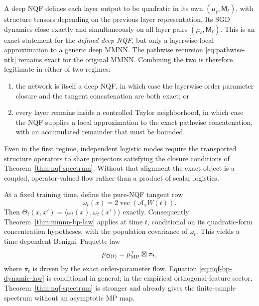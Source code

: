 \documentclass{article}
\begin{document}
A deep NQF defines each layer output to be quadratic in its own
\((\mu_\ell,\mathsf M_\ell)\), with structure tensors depending on the
previous layer representation.  Its SGD dynamics close exactly and
simultaneously on all layer pairs \((\mu_\ell,\mathsf M_\ell)\).  This is an
exact statement for the \emph{defined deep NQF}, but only a layerwise local
approximation to a generic deep MMNN.  The pathwise recursion
\eqref{eq:pathwise-ntk} remains exact for the original MMNN.  Combining the
two is therefore legitimate in either of two regimes:
\begin{enumerate}[leftmargin=1.5em]
\item the network is itself a deep NQF, in which case the layerwise order
parameter closure and the tangent concatenation are both exact; or
\item every layer remains inside a controlled Taylor neighborhood, in which
case the NQF supplies a local approximation to the exact pathwise
concatenation, with an accumulated remainder that must be bounded.
\end{enumerate}
Even in the first regime, independent logistic modes require the transported
structure operators to share projectors satisfying the closure conditions
of Theorem~\ref{thm:nqf-spectrum}.  Without that alignment the exact object
is a coupled, operator-valued flow rather than a product of scalar
logistics.

At a fixed training time, define the pure-NQF tangent row
\begin{equation}
\omega_t(x)=2\operatorname{vec}(\mathscr A_xW(t)).
\label{eq:nqf-tangent-row}
\end{equation}
Then \(\Theta_t(x,x')=\langle\omega_t(x),\omega_t(x')\rangle\) exactly.
Consequently Theorem~\ref{thm:mmnn-bp-law} applies at time \(t\), conditional
on its quadratic-form concentration hypotheses, with the population
covariance of \(\omega_t\).  This yields a time-dependent
Benigni--Paquette law
\begin{equation}
\mu_{\Theta(t)}=\mu_{\rm MP}^{\gamma}\boxtimes\pi_t,
\label{eq:nqf-bp-dynamic-law}
\end{equation}
where \(\pi_t\) is driven by the exact order-parameter flow.  Equation
\eqref{eq:nqf-bp-dynamic-law} is conditional in general; in the empirical
orthogonal-feature sector, Theorem~\ref{thm:nqf-spectrum} is stronger and
already gives the finite-sample spectrum without an asymptotic MP map.
\end{document}
